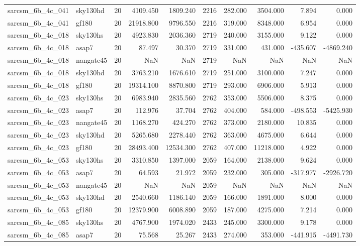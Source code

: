 \begin{longtable}{llrrrrrrrr}
sarcsm\_6b\_4c\_041 & sky130hd & 20 & 4109.450 & 1809.240 & 2216 & 282.000 & 3504.000 & 7.894 & 0.000 \\
sarcsm\_6b\_4c\_041 & gf180 & 20 & 21918.800 & 9796.550 & 2216 & 319.000 & 8348.000 & 6.954 & 0.000 \\
sarcsm\_6b\_4c\_018 & sky130hs & 20 & 4923.830 & 2036.360 & 2719 & 240.000 & 3155.000 & 9.122 & 0.000 \\
sarcsm\_6b\_4c\_018 & asap7 & 20 & 87.497 & 30.370 & 2719 & 331.000 & 431.000 & -435.607 & -4869.240 \\
sarcsm\_6b\_4c\_018 & nangate45 & 20 & NaN & NaN & 2719 & NaN & NaN & NaN & NaN \\
sarcsm\_6b\_4c\_018 & sky130hd & 20 & 3763.210 & 1676.610 & 2719 & 251.000 & 3100.000 & 7.247 & 0.000 \\
sarcsm\_6b\_4c\_018 & gf180 & 20 & 19314.100 & 8870.800 & 2719 & 293.000 & 6906.000 & 5.913 & 0.000 \\
sarcsm\_6b\_4c\_023 & sky130hs & 20 & 6983.940 & 2835.560 & 2762 & 353.000 & 5506.000 & 8.375 & 0.000 \\
sarcsm\_6b\_4c\_023 & asap7 & 20 & 112.976 & 37.704 & 2762 & 404.000 & 584.000 & -498.553 & -5425.930 \\
sarcsm\_6b\_4c\_023 & nangate45 & 20 & 1168.270 & 424.270 & 2762 & 373.000 & 2180.000 & 10.835 & 0.000 \\
sarcsm\_6b\_4c\_023 & sky130hd & 20 & 5265.680 & 2278.440 & 2762 & 363.000 & 4675.000 & 6.644 & 0.000 \\
sarcsm\_6b\_4c\_023 & gf180 & 20 & 28493.400 & 12534.300 & 2762 & 407.000 & 11218.000 & 4.922 & 0.000 \\
sarcsm\_6b\_4c\_053 & sky130hs & 20 & 3310.850 & 1397.000 & 2059 & 164.000 & 2138.000 & 9.624 & 0.000 \\
sarcsm\_6b\_4c\_053 & asap7 & 20 & 64.593 & 21.972 & 2059 & 232.000 & 305.000 & -317.977 & -2926.720 \\
sarcsm\_6b\_4c\_053 & nangate45 & 20 & NaN & NaN & 2059 & NaN & NaN & NaN & NaN \\
sarcsm\_6b\_4c\_053 & sky130hd & 20 & 2540.660 & 1186.140 & 2059 & 166.000 & 1891.000 & 8.000 & 0.000 \\
sarcsm\_6b\_4c\_053 & gf180 & 20 & 12379.900 & 6008.890 & 2059 & 187.000 & 4275.000 & 7.214 & 0.000 \\
sarcsm\_6b\_4c\_085 & sky130hs & 20 & 4767.900 & 1974.020 & 2433 & 245.000 & 3300.000 & 9.178 & 0.000 \\
sarcsm\_6b\_4c\_085 & asap7 & 20 & 75.568 & 25.267 & 2433 & 274.000 & 353.000 & -441.915 & -4491.730 \\

\end{longtable}
